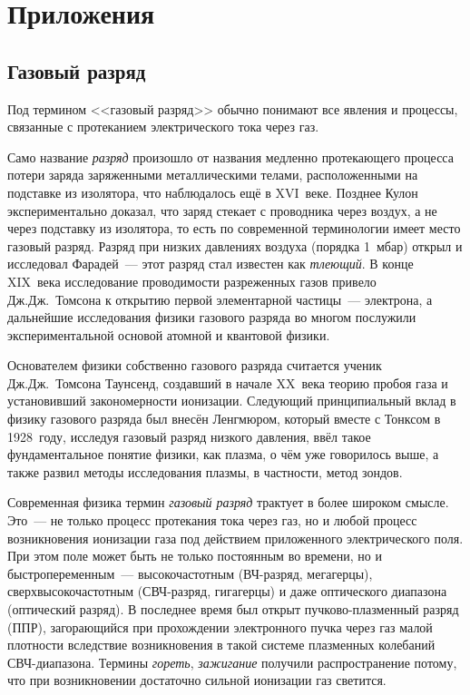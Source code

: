 \section*{Приложения}

\subsection*{Газовый разряд}

Под термином <<газовый разряд>> обычно понимают все явления и процессы, связанные с протеканием электрического тока
через газ.

Само название {\em разряд} произошло от названия медленно протекающего процесса потери заряда заряженными металлическими
телами, расположенными на подставке из изолятора, что наблюдалось ещё в XVI~веке. Позднее Кулон экспериментально
доказал, что заряд стекает с проводника через воздух, а не через подставку из изолятора, то есть по современной
терминологии имеет место газовый разряд. Разряд при низких давлениях воздуха (порядка 1~мбар) открыл и исследовал
Фарадей~--- этот разряд стал известен как \textit{тлеющий}. В конце XIX~века исследование проводимости разреженных газов
привело Дж.Дж.~Томсона к открытию первой элементарной частицы~--- электрона, а дальнейшие исследования физики газового
разряда во многом послужили экспериментальной основой атомной и квантовой физики.

Основателем физики собственно газового разряда считается ученик Дж.Дж.~Томсона Таунсенд, создавший в начале XX~века
теорию пробоя газа и установивший закономерности ионизации. Следующий принципиальный вклад в физику газового разряда был
внесён Ленгмюром, который вместе с Тонксом в 1928~году, исследуя газовый разряд низкого давления, ввёл такое
фундаментальное понятие физики, как плазма, о чём уже говорилось выше, а также развил методы исследования плазмы, в
частности, метод зондов.

Современная физика термин {\em газовый разряд} трактует в более широком смысле. Это~--- не только процесс протекания
тока через газ, но и любой процесс возникновения ионизации газа под действием приложенного электрического поля. При этом
поле может быть не только постоянным во времени, но и быстропеременным~--- высокочастотным (ВЧ-разряд, мегагерцы),
сверхвысокочастотным (СВЧ-разряд, гигагерцы) и даже оптического диапазона (оптический разряд). В последнее время был
открыт пучково-плазменный разряд (ППР), загорающийся при прохождении электронного пучка через газ малой плотности
вследствие возникновения в такой системе плазменных колебаний СВЧ-диапазона. Термины {\em гореть}, {\em зажигание}
получили распространение потому, что при возникновении достаточно сильной ионизации газ светится.

